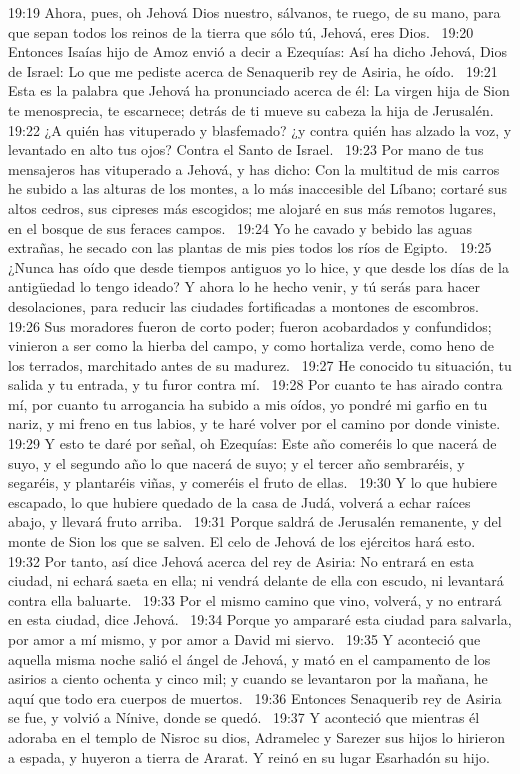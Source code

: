 19:19 Ahora, pues, oh Jehová Dios nuestro, sálvanos, te ruego, de su mano, para que sepan todos los reinos de la tierra que sólo tú, Jehová, eres Dios.  
19:20 Entonces Isaías hijo de Amoz envió a decir a Ezequías: Así ha dicho Jehová, Dios de Israel: Lo que me pediste acerca de Senaquerib rey de Asiria, he oído.  
19:21 Esta es la palabra que Jehová ha pronunciado acerca de él: La virgen hija de Sion te menosprecia, te escarnece; detrás de ti mueve su cabeza la hija de Jerusalén.  
19:22 ¿A quién has vituperado y blasfemado? ¿y contra quién has alzado la voz, y levantado en alto tus ojos? Contra el Santo de Israel.  
19:23 Por mano de tus mensajeros has vituperado a Jehová, y has dicho: Con la multitud de mis carros he subido a las alturas de los montes, a lo más inaccesible del Líbano; cortaré sus altos cedros, sus cipreses más escogidos; me alojaré en sus más remotos lugares, en el bosque de sus feraces campos.  
19:24 Yo he cavado y bebido las aguas extrañas, he secado con las plantas de mis pies todos los ríos de Egipto.  
19:25 ¿Nunca has oído que desde tiempos antiguos yo lo hice, y que desde los días de la antigüedad lo tengo ideado? Y ahora lo he hecho venir, y tú serás para hacer desolaciones, para reducir las ciudades fortificadas a montones de escombros.  
19:26 Sus moradores fueron de corto poder; fueron acobardados y confundidos; vinieron a ser como la hierba del campo, y como hortaliza verde, como heno de los terrados, marchitado antes de su madurez.  
19:27 He conocido tu situación, tu salida y tu entrada, y tu furor contra mí.  
19:28 Por cuanto te has airado contra mí, por cuanto tu arrogancia ha subido a mis oídos, yo pondré mi garfio en tu nariz, y mi freno en tus labios, y te haré volver por el camino por donde viniste.  
19:29 Y esto te daré por señal, oh Ezequías: Este año comeréis lo que nacerá de suyo, y el segundo año lo que nacerá de suyo; y el tercer año sembraréis, y segaréis, y plantaréis viñas, y comeréis el fruto de ellas.  
19:30 Y lo que hubiere escapado, lo que hubiere quedado de la casa de Judá, volverá a echar raíces abajo, y llevará fruto arriba.  
19:31 Porque saldrá de Jerusalén remanente, y del monte de Sion los que se salven. El celo de Jehová de los ejércitos hará esto.  
19:32 Por tanto, así dice Jehová acerca del rey de Asiria: No entrará en esta ciudad, ni echará saeta en ella; ni vendrá delante de ella con escudo, ni levantará contra ella baluarte.  
19:33 Por el mismo camino que vino, volverá, y no entrará en esta ciudad, dice Jehová.  
19:34 Porque yo ampararé esta ciudad para salvarla, por amor a mí mismo, y por amor a David mi siervo.  
19:35 Y aconteció que aquella misma noche salió el ángel de Jehová, y mató en el campamento de los asirios a ciento ochenta y cinco mil; y cuando se levantaron por la mañana, he aquí que todo era cuerpos de muertos.  
19:36 Entonces Senaquerib rey de Asiria se fue, y volvió a Nínive, donde se quedó.  
19:37 Y aconteció que mientras él adoraba en el templo de Nisroc su dios, Adramelec y Sarezer sus hijos lo hirieron a espada, y huyeron a tierra de Ararat. Y reinó en su lugar Esarhadón su hijo.  
